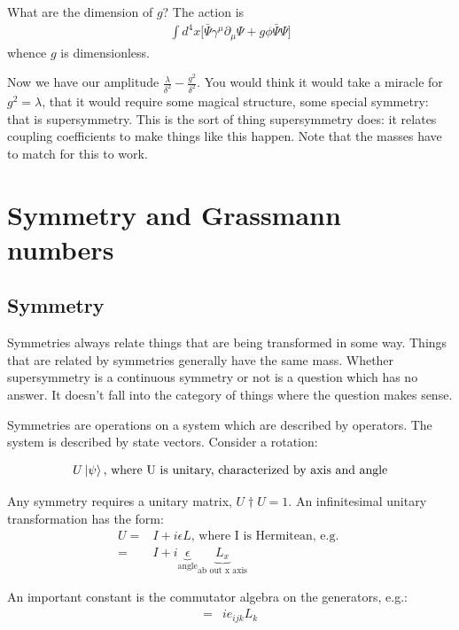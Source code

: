 \documentclass[]{article}
\begin{document}
What are the dimension of $g$? The action is
\begin{align*}
	\int d^4x \big[\bar{\Psi} \gamma^\mu \partial_\mu \Psi + g \phi \bar{\Psi} \Psi\big]
\end{align*}
whence $g$ is dimensionless.

Now we have our amplitude $\frac{\lambda}{\delta^2} - \frac{g^2}{\delta^2}$. You would think it would take a miracle for $g^2=\lambda$, that it would require some magical structure, some special symmetry: that is supersymmetry. This is the sort of thing supersymmetry does: it relates coupling coefficients to make things like this happen. Note that the masses have to match for this to work.


\section{Symmetry and Grassmann numbers}

\subsection{Symmetry}

Symmetries always relate things that are being transformed in some way. Things that are related by symmetries generally have the same mass. Whether supersymmetry is a continuous symmetry or not is a question which has no answer. It doesn't fall into the category of things where the question makes sense.

Symmetries are operations on a system which are described by operators. The system is described by state vectors. Consider a rotation:

\begin{align*}
	U\ket{\psi} \text{, where U is unitary, characterized by axis and angle}
\end{align*}

Any symmetry requires a unitary matrix, $U\dagger U=1$. An infinitesimal unitary transformation has the form:
\begin{align*}
	U =& I + i \epsilon L \text{, where I is Hermitean, e.g. }\\
	=& I + i \underbrace{\epsilon}_\text{angle} \underbrace{L_x}_\text{ab out x axis}
\end{align*}

An important constant is the commutator algebra on the generators, e.g.:
\begin{align*}
	[L_i,L_j] =& i e_{ijk} L_k 
\end{align*}
\end{document}
